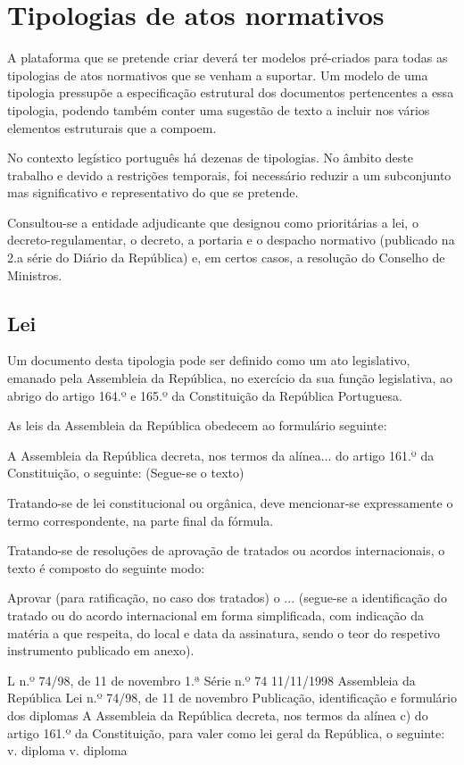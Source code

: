 \chapter{Tipologias de atos normativos}
\label{tipologias}

A plataforma que se pretende criar deverá ter modelos pré-criados para todas as tipologias de atos normativos 
que se venham a suportar. 
Um modelo de uma tipologia pressupõe a especificação estrutural dos documentos pertencentes a essa tipologia, 
podendo também conter uma sugestão de texto a incluir nos vários elementos estruturais que a compoem.

No contexto legístico português há dezenas de tipologias. No âmbito deste trabalho e devido a 
restrições temporais, foi necessário reduzir a um subconjunto mas significativo e representativo do que se pretende.

Consultou-se a entidade adjudicante que designou como prioritárias a lei, o decreto-regulamentar, o decreto, 
a portaria e o despacho normativo 
(publicado na 2.a série do Diário da República) e, em certos casos, a resolução do Conselho de Ministros.

\section{Lei}

Um documento desta tipologia pode ser definido como um ato legislativo, emanado pela Assembleia da República, 
no exercício da sua função legislativa, ao abrigo do artigo 164.º e 165.º da Constituição da República Portuguesa.

As leis da Assembleia da República obedecem ao formulário seguinte:
\begin{quoting}
A Assembleia da República decreta, nos termos da alínea... do artigo 161.º da Constituição, o seguinte:
(Segue-se o texto)
\end{quoting}

Tratando-se de lei constitucional ou orgânica, deve mencionar-se expressamente o termo correspondente, 
na parte final da fórmula. 

Tratando-se de resoluções de aprovação de tratados ou acordos internacionais, o texto é composto do seguinte modo:
\begin{quoting}
Aprovar (para ratificação, no caso dos tratados) o ... 
(segue-se a identificação do tratado ou do acordo internacional em forma simplificada, 
com indicação da matéria a que respeita, do local e data da assinatura, sendo o teor do respetivo 
instrumento publicado em anexo).
\end{quoting}

L n.º 74/98, de 11 de novembro
1.ª Série
n.º 74
11/11/1998
Assembleia da República
Lei n.º 74/98, de 11 de novembro
Publicação, identificação e formulário dos diplomas
A Assembleia da República decreta, nos termos da alínea c) do artigo 161.º da Constituição, para valer como lei geral da República, o seguinte:
v. diploma
v. diploma

